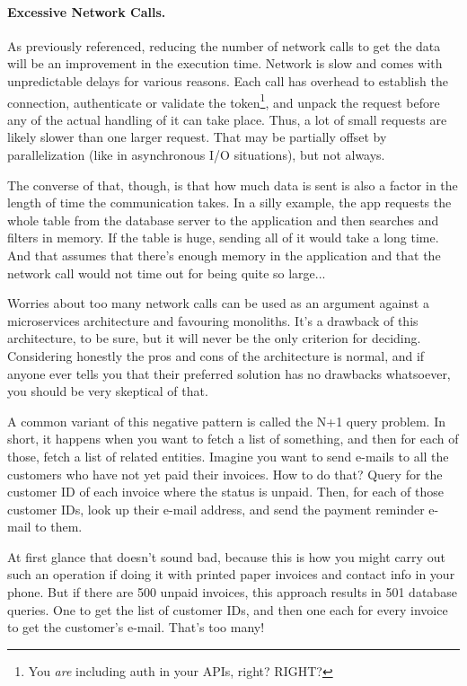 \paragraph{Excessive Network Calls.}
As previously referenced, reducing the number of network calls to get the data will be an improvement in the execution time. Network is slow and comes with unpredictable delays for various reasons. Each call has overhead to establish the connection, authenticate or validate the token\footnote{You \textit{are} including auth in your APIs, right? RIGHT?}, and unpack the request before any of the actual handling of it can take place. Thus, a lot of small requests are likely slower than one larger request. That may be partially offset by parallelization (like in asynchronous I/O situations), but not always.

The converse of that, though, is that how much data is sent is also a factor in the length of time the communication takes. In a silly example, the app requests the whole table from the database server to the application and then searches and filters in memory. If the table is huge, sending all of it would take a long time. And that assumes that there's enough memory in the application and that the network call would not time out for being quite so large...

Worries about too many network calls can be used as an argument against a microservices architecture and favouring monoliths. It's a drawback of this architecture, to be sure, but it will never be the only criterion for deciding. Considering honestly the pros and cons of the architecture is normal, and if anyone ever tells you that their preferred solution has no drawbacks whatsoever, you should be very skeptical of that.

A common variant of this negative pattern is called the N+1 query problem. In short, it happens when you want to fetch a list of something, and then for each of those, fetch a list of related entities. Imagine you want to send e-mails to all the customers who have not yet paid their invoices. How to do that? Query for the customer ID of each invoice where the status is unpaid. Then, for each of those customer IDs, look up their e-mail address, and send the payment reminder e-mail to them.

At first glance that doesn't sound bad, because this is how you might carry out such an operation if doing it with printed paper invoices and contact info in your phone. But if there are 500 unpaid invoices, this approach results in 501 database queries. One to get the list of customer IDs, and then one each for every invoice to get the customer's e-mail. That's too many! 


